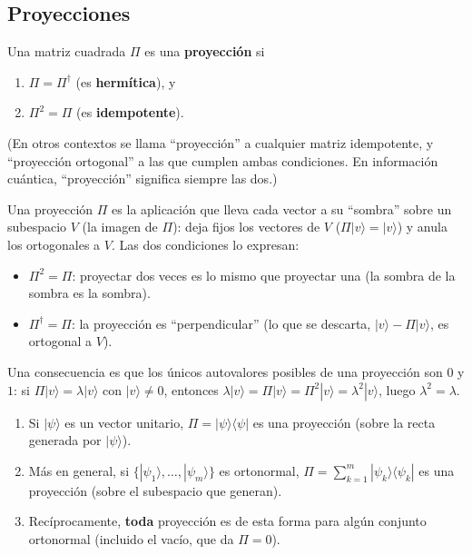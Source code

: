 \documentclass[11pt, a4paper, twoside, openright]{report}
\begin{document}
\subsection{Proyecciones}

\begin{tcolorbox}[colback=teal!5!white,colframe=teal!75!black,title=\textbf{Definición: Proyección}]
Una matriz cuadrada $\Pi$ es una \textbf{proyección} si
\begin{enumerate}
    \item $\Pi = \Pi^\dagger$ (es \textbf{hermítica}), y
    \item $\Pi^2 = \Pi$ (es \textbf{idempotente}).
\end{enumerate}
\end{tcolorbox}

\noindent (En otros contextos se llama ``proyección'' a cualquier matriz idempotente, y ``proyección ortogonal'' a las que cumplen ambas condiciones. En información cuántica, ``proyección'' significa siempre las dos.)

\begin{tcolorbox}[colback=blue!5!white,colframe=blue!75!black,title=\textbf{Nota Aclaratoria: Qué hace geométricamente una proyección}]
Una proyección $\Pi$ es la aplicación que lleva cada vector a su ``sombra'' sobre un subespacio $V$ (la imagen de $\Pi$): deja fijos los vectores de $V$ ($\Pi|v\rangle = |v\rangle$) y anula los ortogonales a $V$. Las dos condiciones lo expresan:
\begin{itemize}
    \item $\Pi^2 = \Pi$: proyectar dos veces es lo mismo que proyectar una (la sombra de la sombra es la sombra).
    \item $\Pi^\dagger = \Pi$: la proyección es ``perpendicular'' (lo que se descarta, $|v\rangle - \Pi|v\rangle$, es ortogonal a $V$).
\end{itemize}
Una consecuencia es que los únicos autovalores posibles de una proyección son $0$ y $1$: si $\Pi|v\rangle = \lambda|v\rangle$ con $|v\rangle\neq0$, entonces $\lambda|v\rangle = \Pi|v\rangle = \Pi^2|v\rangle = \lambda^2|v\rangle$, luego $\lambda^2 = \lambda$.
\end{tcolorbox}

\begin{tcolorbox}[colback=teal!5!white,colframe=teal!75!black,title=\textbf{Proposición: Proyecciones asociadas a conjuntos ortonormales}]
\begin{enumerate}
    \item Si $|\psi\rangle$ es un vector unitario, $\Pi = |\psi\rangle\langle\psi|$ es una proyección (sobre la recta generada por $|\psi\rangle$).
    \item Más en general, si $\{|\psi_1\rangle,\dots,|\psi_m\rangle\}$ es ortonormal, $\Pi = \sum_{k=1}^m|\psi_k\rangle\langle\psi_k|$ es una proyección (sobre el subespacio que generan).
    \item Recíprocamente, \textbf{toda} proyección es de esta forma para algún conjunto ortonormal (incluido el vacío, que da $\Pi = 0$).
\end{enumerate}
\end{tcolorbox}
\end{document}
